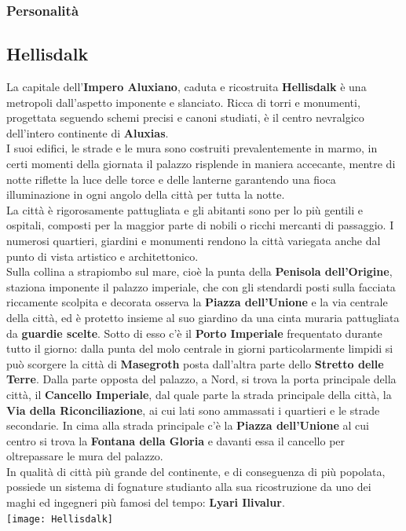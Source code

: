 \documentclass[10pt,twoside,onecolumn,openany]{book}
\begin{document}
\subsubsection{Personalità}
\newpage
\subsection{Hellisdalk}
La capitale dell'\textbf{Impero Aluxiano}, caduta e ricostruita \textbf{Hellisdalk} è una metropoli dall'aspetto imponente e slanciato. Ricca di torri e monumenti, progettata seguendo schemi precisi e canoni studiati, è il centro nevralgico dell'intero continente di \textbf{Aluxias}.\\
I suoi edifici, le strade e le mura sono costruiti prevalentemente in marmo, in certi momenti della giornata il palazzo risplende in maniera accecante, mentre di notte riflette la luce delle torce e delle lanterne garantendo una fioca illuminazione in ogni angolo della città per tutta la notte.\\
La città è rigorosamente pattugliata e gli abitanti sono per lo più gentili e ospitali, composti per la maggior parte di nobili o ricchi mercanti di passaggio. I numerosi quartieri, giardini e monumenti rendono la città variegata anche dal punto di vista artistico e architettonico.\\
Sulla collina a strapiombo sul mare, cioè la punta della \textbf{Penisola dell'Origine}, staziona imponente il palazzo imperiale, che con gli stendardi posti sulla facciata riccamente scolpita e decorata osserva la \textbf{Piazza dell'Unione} e la via centrale della città, ed è protetto insieme al suo giardino da una cinta muraria pattugliata da \textbf{guardie scelte}. Sotto di esso c'è il \textbf{Porto Imperiale} frequentato durante tutto il giorno: dalla punta del molo centrale in giorni particolarmente limpidi si può scorgere la città di \textbf{Masegroth} posta dall'altra parte dello \textbf{Stretto delle Terre}. Dalla parte opposta del palazzo, a Nord, si trova la porta principale della città, il \textbf{Cancello Imperiale}, dal quale parte la strada principale della città, la \textbf{Via della Riconciliazione}, ai cui lati sono ammassati i quartieri e le strade secondarie. In cima alla strada principale c'è la \textbf{Piazza dell'Unione} al cui centro si trova la \textbf{Fontana della Gloria} e davanti essa il cancello per oltrepassare le mura del palazzo.\\
In qualità di città più grande del continente, e di conseguenza di più popolata, possiede un sistema di fognature studianto alla sua ricostruzione da uno dei maghi ed ingegneri più famosi del tempo: \textbf{Lyari Ilivalur}.\\
\texttt{[image: Hellisdalk]}
\newpage
\end{document}
